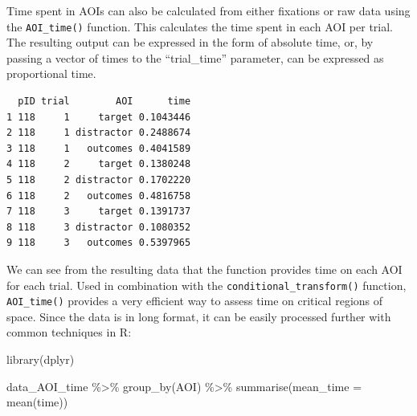 \documentclass[
  man,
  floatsintext,
  longtable,
  nolmodern,
  notxfonts,
  notimes,
  colorlinks=true,linkcolor=blue,citecolor=blue,urlcolor=blue]{apa7}
\newenvironment{Shaded}{\begin{snugshade}}{\end{snugshade}}
\newcommand{\AttributeTok}[1]{\textcolor[rgb]{0.40,0.45,0.13}{#1}}
\newcommand{\ConstantTok}[1]{\textcolor[rgb]{0.56,0.35,0.01}{#1}}
\newcommand{\DecValTok}[1]{\textcolor[rgb]{0.68,0.00,0.00}{#1}}
\newcommand{\FunctionTok}[1]{\textcolor[rgb]{0.28,0.35,0.67}{#1}}
\newcommand{\NormalTok}[1]{\textcolor[rgb]{0.00,0.23,0.31}{#1}}
\newcommand{\OtherTok}[1]{\textcolor[rgb]{0.00,0.23,0.31}{#1}}
\newcommand{\SpecialCharTok}[1]{\textcolor[rgb]{0.37,0.37,0.37}{#1}}
\newcommand{\StringTok}[1]{\textcolor[rgb]{0.13,0.47,0.30}{#1}}
\begin{document}
Time spent in AOIs can also be calculated from either fixations or raw
data using the \texttt{AOI\_time()} function. This calculates the time
spent in each AOI per trial. The resulting output can be expressed in
the form of absolute time, or, by passing a vector of times to the
``trial\_time'' parameter, can be expressed as proportional time.

\begin{Shaded}
\end{Shaded}

\begin{verbatim}
  pID trial        AOI      time
1 118     1     target 0.1043446
2 118     1 distractor 0.2488674
3 118     1   outcomes 0.4041589
4 118     2     target 0.1380248
5 118     2 distractor 0.1702220
6 118     2   outcomes 0.4816758
7 118     3     target 0.1391737
8 118     3 distractor 0.1080352
9 118     3   outcomes 0.5397965
\end{verbatim}

We can see from the resulting data that the function provides time on
each AOI for each trial. Used in combination with the
\texttt{conditional\_transform()} function, \texttt{AOI\_time()}
provides a very efficient way to assess time on critical regions of
space. Since the data is in long format, it can be easily processed
further with common techniques in R:

\begin{Shaded}
\begin{Highlighting}[]
\FunctionTok{library}\NormalTok{(dplyr)}

\NormalTok{data\_AOI\_time }\SpecialCharTok{\%\textgreater{}\%} 
  \FunctionTok{group\_by}\NormalTok{(AOI) }\SpecialCharTok{\%\textgreater{}\%} 
  \FunctionTok{summarise}\NormalTok{(}\AttributeTok{mean\_time =} \FunctionTok{mean}\NormalTok{(time))}
\end{Highlighting}
\end{Shaded}
\end{document}
